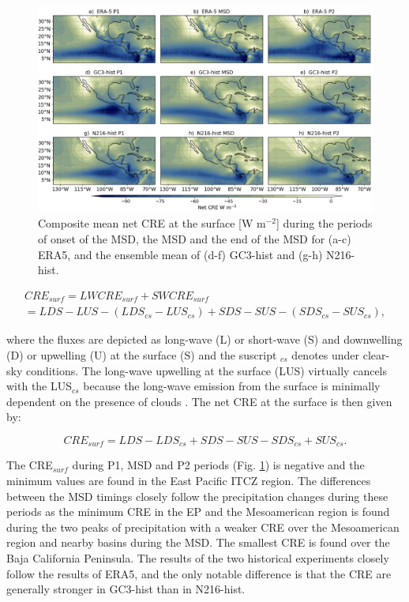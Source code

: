 \begin{figure}[b!]
\includegraphics[width=\linewidth]{figures/fig4_creclim_3.png}
\caption[Composites of cloud radiative effects]{Composite mean net CRE at the surface [W m$^{-2}$] during the periods of onset of the MSD, the MSD and the end of the MSD for (a-c) ERA5, and the ensemble mean of (d-f) GC3-hist and (g-h) N216-hist.}
\label{fig:cre_comp}
\end{figure}

\begin{multline}
CRE_{surf}=LW CRE_{surf} +SW CRE_{surf} \\ = LDS-LUS -(LDS_{cs}-LUS_{cs})+SDS-SUS-(SDS_{cs}-SUS_{cs}),
\end{multline}

\noindent where the fluxes are depicted as long-wave (L) or short-wave (S) and downwelling (D) or upwelling (U) at the surface (S) and the suscript $_{cs}$ denotes under clear-sky conditions. The long-wave upwelling at the surface (LUS) virtually cancels with the LUS$_{cs}$ because the long-wave emission from the surface is minimally dependent on the presence of clouds \citep{allan2011}. The net CRE at the surface is then given by:

\begin{equation}
CRE_{surf}=  LDS-LDS_{cs}+SDS-SUS-SDS_{cs}+SUS_{cs}.
\end{equation}

The CRE$_{surf}$ during P1, MSD and P2 periods (Fig. \ref{fig:cre_comp}) is negative  and the minimum values are found in the East Pacific ITCZ region. The differences between the MSD timings closely follow the precipitation changes during these periods as the minimum CRE in the EP and the Mesoamerican region is found during the two peaks of precipitation with a weaker CRE over the Mesoamerican region and nearby basins during the MSD. The smallest CRE is found over the Baja California Peninsula. 
The results of the two historical experiments closely follow the results of ERA5, and the only notable difference is that the CRE are generally stronger in GC3-hist than in N216-hist.

